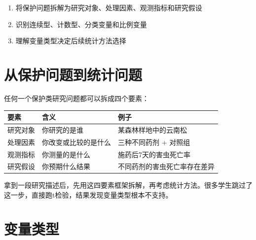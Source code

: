 \documentclass[
  letterpaper,
]{scrbook}
\newcounter{none} %
\providecommand{\tightlist}{%
  \setlength{\itemsep}{0pt}\setlength{\parskip}{0pt}}
\begin{document}
\begin{enumerate}
\def\labelenumi{\arabic{enumi}.}
\tightlist
\item
  将保护问题拆解为研究对象、处理因素、观测指标和研究假设
\item
  识别连续型、计数型、分类变量和比例变量
\item
  理解变量类型决定后续统计方法选择
\end{enumerate}

\section{从保护问题到统计问题}\label{ux4eceux4fddux62a4ux95eeux9898ux5230ux7edfux8ba1ux95eeux9898}

任何一个保护类研究问题都可以拆成四个要素：

{\def\LTcaptype{none} %
\begin{longtable}[]{@{}lll@{}}
\toprule\noalign{}
要素 & 含义 & 例子 \\
\midrule\noalign{}
\endhead
\bottomrule\noalign{}
\endlastfoot
研究对象 & 你研究的是谁 & 某森林样地中的云南松 \\
处理因素 & 你改变或比较的是什么 & 三种不同药剂 + 对照组 \\
观测指标 & 你测量的是什么 & 施药后7天的害虫死亡率 \\
研究假设 & 你预期什么结果 & 不同药剂的害虫死亡率存在差异 \\
\end{longtable}
}

\begin{tcolorbox}[enhanced jigsaw, arc=.35mm, bottomrule=.15mm, bottomtitle=1mm, breakable, colback=white, colbacktitle=quarto-callout-tip-color!10!white, colframe=quarto-callout-tip-color-frame, coltitle=black, left=2mm, leftrule=.75mm, opacityback=0, opacitybacktitle=0.6, rightrule=.15mm, title=\textcolor{quarto-callout-tip-color}{\faLightbulb}\hspace{0.5em}{课堂技巧}, titlerule=0mm, toprule=.15mm, toptitle=1mm]

拿到一段研究描述后，先用这四要素框架拆解，再考虑统计方法。很多学生跳过了这一步，直接跑t检验，结果发现变量类型根本不支持。

\end{tcolorbox}

\section{变量类型}\label{ux53d8ux91cfux7c7bux578b}
\end{document}
